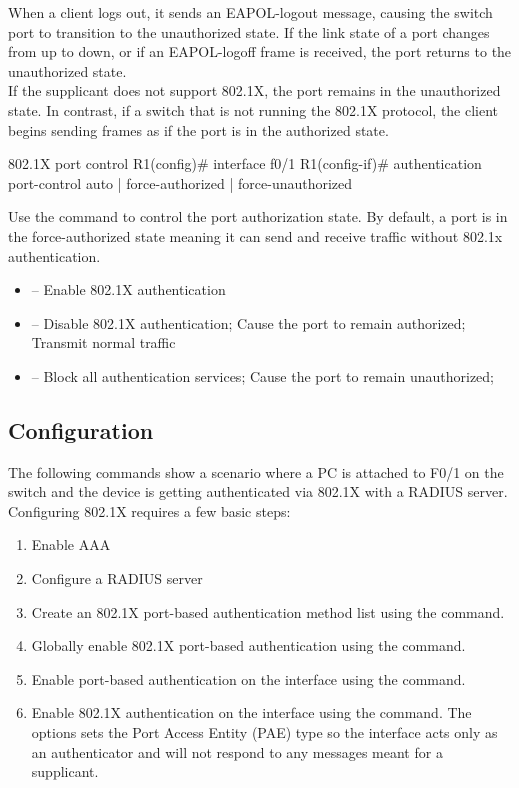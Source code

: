 When a client logs out, it sends an EAPOL-logout message, causing the switch port to transition to the unauthorized state. If the link state of a port changes from up to down, or if an EAPOL-logoff frame is received, the port returns to the unauthorized state.\\    

If the supplicant does not support 802.1X, the port remains in the unauthorized state. In contrast, if a switch that is not running the 802.1X protocol, the client begins sending frames as if the port is in the authorized state.\\

\begin{sexylisting}{802.1X port control}
R1(config)# interface f0/1
R1(config-if)# authentication port-control {auto | force-authorized | force-unauthorized}
\end{sexylisting}

Use the  command to control the port authorization state. By default, a port is in the force-authorized state meaning it can send and receive traffic without 802.1x authentication.

\begin{itemize}
\item {} -- Enable 802.1X authentication
\item {} -- Disable 802.1X authentication; Cause the port to remain authorized; Transmit normal traffic
\item {} -- Block all authentication services; Cause the port to remain unauthorized;
\end{itemize}

\subsection{Configuration}

The following commands show a scenario where a PC is attached to F0/1 on the switch and the device is getting authenticated via 802.1X with a RADIUS server. Configuring 802.1X requires a few basic steps:

\begin{enumerate}
\item Enable AAA 
\item Configure a RADIUS server
\item Create an 802.1X port-based authentication method list using the  command.
\item Globally enable 802.1X port-based authentication using the  command.
\item Enable port-based authentication on the interface using the  command.
\item Enable 802.1X authentication on the interface using the  command. The  options sets the Port Access Entity (PAE) type so the interface acts only as an authenticator and will not respond to any messages meant for a supplicant.
\end{enumerate}

